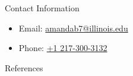 \documentclass[final]{beamer}
\newlength{\onecolwid}
\newlength{\threecolwid}
\begin{document}
\begin{frame}[t]
\begin{columns}[t,totalwidth=\threecolwid]
\begin{column}{\onecolwid}
\begin{alertblock}{Contact Information}
	\begin{itemize}
		\item Email: \href{mailto:amandab7@illinois.edu}{amandab7@illinois.edu}
		\item Phone: \href{tel:12173003132}{+1 217-300-3132}
	\end{itemize}
	
\end{alertblock}

\begin{block}{References}

	{\footnotesize 
	}
\end{block}





\end{column} %

\end{columns} %

\end{frame} %
\end{document}
